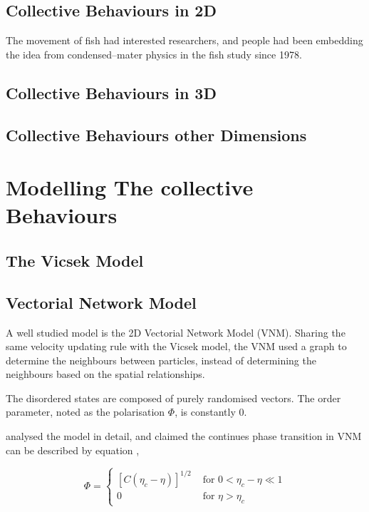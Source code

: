 \documentclass[11pt,twoside]{report}
\begin{document}
\subsection{Collective Behaviours in 2D}

The movement of fish had interested researchers, and people had been embedding the idea from condensed--mater physics in the fish study since 1978. \cite{}

\subsection{Collective Behaviours in 3D}

\subsection{Collective Behaviours other Dimensions}

\section{Modelling The collective Behaviours}

\subsection{The Vicsek Model}

\subsection{Vectorial Network Model}

A well studied model is the 2D Vectorial Network Model (VNM). Sharing the same velocity updating rule with the Vicsek model, the VNM used a graph to determine the neighbours between particles, instead of determining the neighbours based on the spatial relationships. 

The disordered states are composed of purely randomised vectors. The order parameter, noted as the polarisation $\Phi$, is constantly 0.

\citeauthor{aldana2003} analysed the model in detail, and claimed the continues phase transition in VNM can be described by equation \cite{aldana2003},

\begin{equation}
	\Phi=\left\{\begin{array}{ll}{\left[C\left(\eta_{c}-\eta\right)\right]^{1 / 2}} & \text { for } 0<\eta_{c}-\eta \ll 1 \\ 0 & \text { for } \eta>\eta_{c}\end{array}\right.	
\end{equation}
\end{document}
